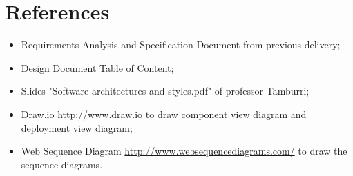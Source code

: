 \documentclass[12pt,a4paper]{article}
\begin{document}
	
	\tableofcontents
	\newpage
	
	
	
	
	
	\newpage
	\section{References}
	\begin{itemize}
		\item Requirements Analysis and Specification Document from previous delivery;
		\item Design Document Table of Content;
		\item Slides "Software architectures and styles.pdf" of professor Tamburri;
		\item Draw.io \url{http://www.draw.io} to draw component view diagram and deployment view diagram;
		\item Web Sequence Diagram \url{http://www.websequencediagrams.com/} to draw the sequence diagrams. 
	\end{itemize}
	
\end{document}
